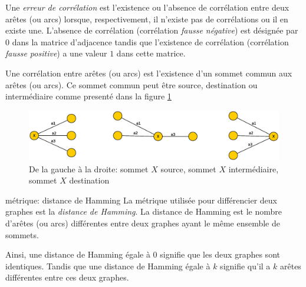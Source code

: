 \begin{definition}
Une {\em erreur de corr\'elation} est l'existence ou l'absence de corr\'elation entre deux ar\^etes (ou arcs) lorsque, respectivement, il n'existe pas de corr\'elations ou il en existe une.
\newline
L'absence de corr\'elation (corr\'elation {\em fausse n\'egative}) est d\'esign\'ee par $0$ dans la matrice d'adjacence tandis que l'existence de corr\'elation (corr\'elation {\em fausse positive}) a une valeur $1$ dans cette matrice. 
\end{definition}

\begin{definition}
Une corr\'elation entre ar\^etes (ou arcs) est l'existence d'un sommet commun aux ar\^etes (ou arcs). Ce sommet commun peut \^etre source, destination ou interm\'ediaire comme present\'e dans la figure \ref{typeSommetEnCommun}
\begin{centering} 
\begin{figure}[htb!] 
\includegraphics[scale=0.50]{images/typeSommetsEnCommun.eps}
\caption{De la gauche \`a la droite: sommet $X$ source, sommet $X$ interm\'ediaire, sommet $X$ destination}
\label{typeSommetEnCommun} 
\end{figure}
\end{centering} 
\end{definition}

\begin{definition}{ m\'etrique: distance de Hamming} \newline
La m\'etrique utilis\'ee pour diff\'erencier deux graphes est la {\em distance de Hamming}.
La distance de Hamming est le nombre d'ar\^etes (ou arcs) diff\'erentes entre deux graphes ayant le m\^eme ensemble de sommets. 
\end{definition}
Ainsi, une distance de Hamming \'egale \`a $0$ signifie que les deux graphes sont identiques. Tandis que  une distance de Hamming \'egale \`a $k$ signifie qu'il a $k$ ar\^etes diff\'erentes entre ces deux graphes.

